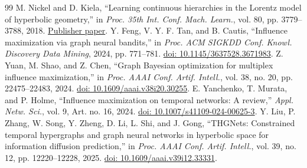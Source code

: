 \documentclass[journal]{IEEEtran}
\begin{document}
\begin{thebibliography}{99}
 M. Nickel and D. Kiela, ``Learning continuous hierarchies in the Lorentz model of hyperbolic geometry,'' in \emph{Proc. 35th Int. Conf. Mach. Learn.}, vol. 80, pp. 3779--3788, 2018. \href{https://proceedings.mlr.press/v80/nickel18a.html}{Publisher paper}.
 Y. Feng, V. Y. F. Tan, and B. Cautis, ``Influence maximization via graph neural bandits,'' in \emph{Proc. ACM SIGKDD Conf. Knowl. Discovery Data Mining}, 2024, pp. 771--781. \href{https://doi.org/10.1145/3637528.3671983}{doi: 10.1145/3637528.3671983}.
 Z. Yuan, M. Shao, and Z. Chen, ``Graph Bayesian optimization for multiplex influence maximization,'' in \emph{Proc. AAAI Conf. Artif. Intell.}, vol. 38, no. 20, pp. 22475--22483, 2024. \href{https://doi.org/10.1609/aaai.v38i20.30255}{doi: 10.1609/aaai.v38i20.30255}.
 E. Yanchenko, T. Murata, and P. Holme, ``Influence maximization on temporal networks: A review,'' \emph{Appl. Netw. Sci.}, vol. 9, Art. no. 16, 2024. \href{https://doi.org/10.1007/s41109-024-00625-3}{doi: 10.1007/s41109-024-00625-3}.
 Y. Liu, P. Zhang, W. Song, Y. Zheng, D. Li, L. Shi, and J. Gong, ``THGNets: Constrained temporal hypergraphs and graph neural networks in hyperbolic space for information diffusion prediction,'' in \emph{Proc. AAAI Conf. Artif. Intell.}, vol. 39, no. 12, pp. 12220--12228, 2025. \href{https://doi.org/10.1609/aaai.v39i12.33331}{doi: 10.1609/aaai.v39i12.33331}.
\end{thebibliography}
\end{document}
